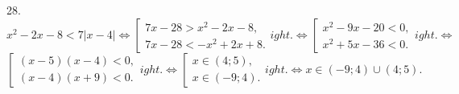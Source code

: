 28. $x^2-2x-8<7|x-4|\Leftrightarrow \left[\begin{array}{l} 7x-28>x^2-2x-8,\\ 7x-28<-x^2+2x+8.\end{array}
ight.\Leftrightarrow
\left[\begin{array}{l} x^2-9x-20<0,\\ x^2+5x-36<0.\end{array}
ight.\Leftrightarrow$\\$
\left[\begin{array}{l} (x-5)(x-4)<0,\\ (x-4)(x+9)<0.\end{array}
ight.\Leftrightarrow
\left[\begin{array}{l} x\in(4;5),\\ x\in(-9;4).\end{array}
ight.\Leftrightarrow x\in (-9;4)\cup(4;5).$\\
